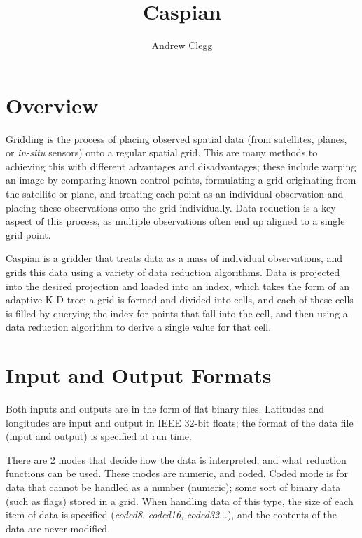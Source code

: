 \documentclass[a4paper,12pt]{article}
\title{Caspian}
\author{Andrew Clegg}
\begin{document}
\maketitle
{}
\tableofcontents
\section{Overview}
Gridding is the process of placing observed spatial data (from satellites, planes, or \textit{in-situ} sensors) onto a regular spatial grid. This are many methods to achieving this with different advantages and disadvantages; these include warping an image by comparing known control points, formulating a grid originating from the satellite or plane, and treating each point as an individual observation and placing these observations onto the grid individually. Data reduction is a key aspect of this process, as multiple observations often end up aligned to a single grid point.

Caspian is a gridder that treats data as a mass of individual observations, and grids this data using a variety of data reduction algorithms. Data is projected into the desired projection and loaded into an index, which takes the form of an adaptive K-D tree; a grid is formed and divided into cells, and each of these cells is filled by querying the index for points that fall into the cell, and then using a data reduction algorithm to derive a single value for that cell.

\section{Input and Output Formats}
Both inputs and outputs are in the form of flat binary files. Latitudes and longitudes are input and output in IEEE 32-bit floats; the format of the data file (input and output) is specified at run time.

There are 2 modes that decide how the data is interpreted, and what reduction functions can be used. These modes are numeric, and coded. Coded mode is for data that cannot be handled as a number (numeric); some sort of binary data (such as flags) stored in a grid. When handling data of this type, the size of each item of data is specified (\textit{coded8}, \textit{coded16}, \textit{coded32}...), and the contents of the data are never modified.
\end{document}
